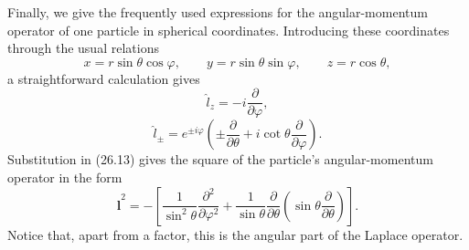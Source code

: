 Finally, we give the frequently used expressions for the angular-momentum
operator of one particle in spherical coordinates. Introducing these
coordinates through the usual relations
\[
  x=r\sin\theta\cos\varphi,\qquad
  y=r\sin\theta\sin\varphi,\qquad
  z=r\cos\theta,
\]
a straightforward calculation gives
\begin{equation}
  \hat l_z=-i\frac{\partial}{\partial\varphi},
  \tag{26.14}
\end{equation}
\begin{equation}
  \hat l_\pm=e^{\pm i\varphi}
  \left(\pm\frac{\partial}{\partial\theta}
  +i\cot\theta\frac{\partial}{\partial\varphi}\right).
  \tag{26.15}
\end{equation}
Substitution in (26.13) gives the square of the particle's angular-momentum
operator in the form
\begin{equation}
  \hat{\mathbf l}^{2}=-\left[
  \frac{1}{\sin^2\theta}\frac{\partial^2}{\partial\varphi^2}
  +\frac{1}{\sin\theta}\frac{\partial}{\partial\theta}
  \left(\sin\theta\frac{\partial}{\partial\theta}\right)\right].
  \tag{26.16}
\end{equation}
Notice that, apart from a factor, this is the angular part of the Laplace
operator.

